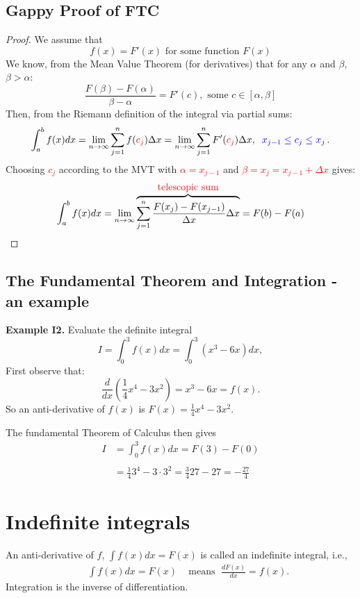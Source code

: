 \documentclass{article}
\begin{document}
\subsection{Gappy Proof of FTC}
\begin{proof}
We assume that
$$
f(x) = F'(x) \mbox{ for some function } F(x)
$$
We know, from the Mean Value Theorem (for derivatives) that for any $\alpha$ and $\beta$, $\beta > \alpha$:
$$
\frac{F(\beta) - F(\alpha)}{\beta - \alpha} = F'(c), \mbox{ some } c \in [\alpha, \beta]
$$
Then, from the Riemann definition of the integral via partial sums:
$$
\int_a^b f(x) dx= \lim_{n \to \infty} \sum_{j=1}^{n} f(\textcolor{red}{c_j}) \Delta x =  \lim_{n \to \infty} \sum_{j=1}^{n} F'(\textcolor{red}{c_j}) \Delta x, \;\;  \textcolor{blue}{x_{j-1} \leq c_j \leq x_{j}}\,.
$$
Choosing \textcolor{red}{$c_j$} according to the MVT with \textcolor{red}{$\alpha = x_{j-1}$} and \textcolor{red}{$\beta = x_j = x_{j-1} + \Delta x$} gives:
{\small 
$$
\int_a^b f(x) dx = \lim_{n \to \infty} \overbrace{\sum_{j=1}^{n} \frac{F(x_j) - F(x_{j-1})}{\Delta x} \Delta x}^{\mbox{\textcolor{red}{telescopic sum}}}= F(b) - F(a)
$$
}
\end{proof}
\newpage
\subsection{The Fundamental Theorem and Integration - an example}
\textbf{Example I2.} Evaluate the definite integral
$$
I=\int_0^3 f(x)  dx = \int_0^3 (x^3- 6x) dx,
$$
First observe that:
$$
\frac{d}{d x} \left( \frac{1}{4}x^4-3 x^2 \right)=x^3- 6x=f(x).
$$
So an anti-derivative of $f(x)$ is $F(x)=\frac{1}{4}x^4-3 x^2$.  

The fundamental Theorem of Calculus then gives
$$
\begin{array}{ll}
I & = \displaystyle\int_0^3 f(x)  dx =F(3) -F(0) \\ 
\\ & = \frac{1}{4} 3^4-3\cdot3^2 =\frac{3}{4} 27- 27= -\frac{27}{4}
\end{array}
$$
\section{Indefinite integrals}  
An anti-derivative of $f$, $ \int f(x) dx =F(x)$ is called an indefinite integral, i.e.,
\begin{eqnarray}
&  &\int  f(x) d x =F(x) \;\;  \; \mbox{ means } \; \frac{d
F(x)}{d x}= f(x).    \nonumber
\end{eqnarray}
Integration is the inverse of differentiation.
\end{document}
